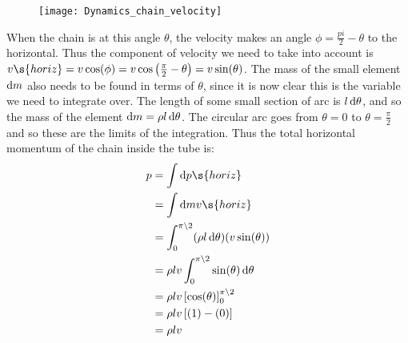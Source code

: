 \begin{problem}
{\begin{enumerate}
\begin{figure}[h]
\centering
\texttt{[image: Dynamics\_chain\_velocity]}
\caption{}
\label{fig:Dynamics_chain_velocity}
\end{figure}

When the chain is at this angle $\theta$, the velocity makes an angle $\phi = \frac{pi}{2} - \theta$ to the horizontal. Thus the component of velocity we need to take into account is $v\s{horiz} = v \cos(\phi) = v \cos\left(\frac{\pi}{2} - \theta\right) = v \sin(\theta)$. The mass of the small element $\operatorname{d}\! m$ also needs to be found in terms of $\theta$, since it is now clear this is the variable we need to integrate over. The length of some small section of arc is $l \operatorname{d}\! \theta$, and so the mass of the element $\operatorname{d}\! m = \rho l \operatorname{d}\!\theta$. The circular arc goes from $\theta = 0$ to $\theta =  \frac{\pi}{2}$ and so these are the limits of the integration. Thus the total horizontal momentum of the chain inside the tube is:
\begin{align*} p &= \int \d p\s{horiz} \\ &= \int \d m v\s{horiz} \\ &= \int_{0}^{\pi\backslash 2} (\rho l \d\theta)(v \sin(\theta)) \\ &= \rho l v \int_{0}^{\pi \backslash 2} \sin(\theta) \d\theta \\ &= \rho l v \left[ \cos(\theta)\right]_{0}^{\pi \backslash 2} \\ &= \rho l v \left[ (1) - (0) \right] \\ &= \rho l v \end{align*}



\end{enumerate}}
\end{problem}
